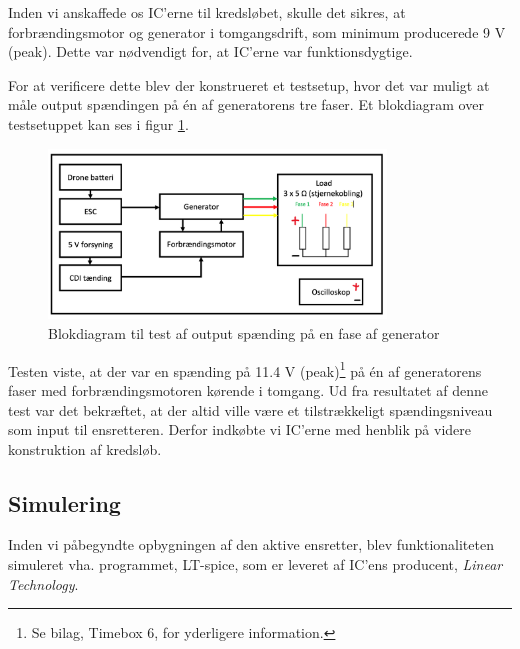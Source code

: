 Inden vi anskaffede os IC’erne til kredsløbet, skulle det sikres, at forbrændingsmotor og generator i tomgangsdrift, som minimum producerede 9 V (peak). Dette var nødvendigt for, at IC’erne var funktionsdygtige. %


For at verificere dette blev der konstrueret et testsetup, hvor det var muligt at måle output spændingen på én af generatorens tre faser. Et blokdiagram over testsetuppet kan ses i figur \ref{fig:prens5}.

\begin{figure}[h]
  \centering
  \includegraphics[width=0.8\textwidth]{./figurer/prens5.png}
  \caption{Blokdiagram til test af output spænding på en fase af generator}
  \label{fig:prens5}
\end{figure}

Testen viste, at der var en spænding på 11.4 V (peak)\footnote{Se bilag, Timebox 6, for yderligere information.} på én af generatorens faser med forbrændingsmotoren kørende i tomgang. Ud fra resultatet af denne test var det bekræftet, at der altid ville være et tilstrækkeligt spændingsniveau som input til ensretteren. Derfor indkøbte vi IC’erne med henblik på videre konstruktion af kredsløb.

\subsection{Simulering}
\label{sec:simulering}

Inden vi påbegyndte opbygningen af den aktive ensretter, blev funktionaliteten simuleret vha. programmet, LT-spice, som er leveret af IC’ens producent, \textit{Linear Technology}.

